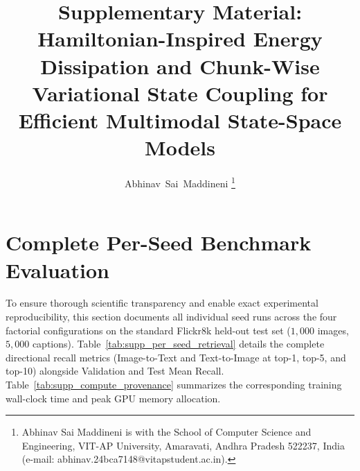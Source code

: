 \documentclass[journal]{IEEEtran}
\begin{document}
\title{Supplementary Material: Hamiltonian-Inspired Energy Dissipation and Chunk-Wise Variational State Coupling for Efficient Multimodal State-Space Models}

\author{Abhinav~Sai~Maddineni%
\thanks{Abhinav Sai Maddineni is with the School of Computer Science and Engineering, VIT-AP University, Amaravati, Andhra Pradesh 522237, India (e-mail: abhinav.24bca7148@vitapstudent.ac.in).}}

\maketitle

\appendices

\section{Complete Per-Seed Benchmark Evaluation}
\label{sec:supp_per_seed_results}
To ensure thorough scientific transparency and enable exact experimental reproducibility, this section documents all individual seed runs across the four factorial configurations on the standard Flickr8k held-out test set ($1{,}000$ images, $5{,}000$ captions). Table~\ref{tab:supp_per_seed_retrieval} details the complete directional recall metrics (Image-to-Text and Text-to-Image at top-1, top-5, and top-10) alongside Validation and Test Mean Recall. Table~\ref{tab:supp_compute_provenance} summarizes the corresponding training wall-clock time and peak GPU memory allocation.
\end{document}
